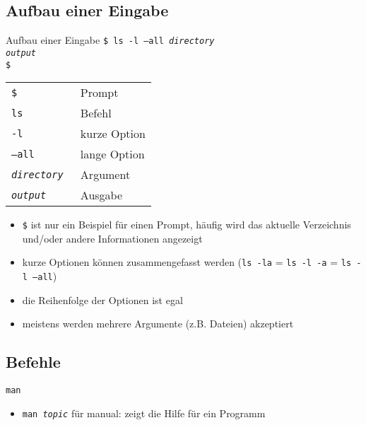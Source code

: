  \subsection{Aufbau einer Eingabe}
    \begin{frame}{Aufbau einer Eingabe}
      \texttt{\$ ls -l --all \textit{directory}\\
              \textit{output}\\
              \$}
      \begin{center}
        \begin{tabular}{>{\tt}l l}
          \toprule
          \$                 & Prompt       \\
          ls                 & Befehl       \\
          -l                 & kurze Option \\
          --all              & lange Option \\
          \textit{directory} & Argument     \\
          \textit{output}    & Ausgabe      \\
          \bottomrule
        \end{tabular}
      \end{center}
    \end{frame}

    \begin{frame}
      \begin{itemize}
        \item \texttt{\$} ist nur ein Beispiel für einen Prompt, häufig wird das aktuelle Verzeichnis und/oder andere Informationen angezeigt
        \item kurze Optionen können zusammengefasst werden (\texttt{ls~-la} = \texttt{ls -l -a} = \texttt{ls -l --all})
        \item die Reihenfolge der Optionen ist egal
        \item meistens werden mehrere Argumente (z.B. Dateien) akzeptiert
      \end{itemize}
    \end{frame}

  \subsection{Befehle}
    \begin{frame}{\texttt{man}}
      \begin{itemize}
        \item \texttt{man \textit{topic}} für manual: zeigt die Hilfe für ein Programm
      \end{itemize}
    \end{frame}

